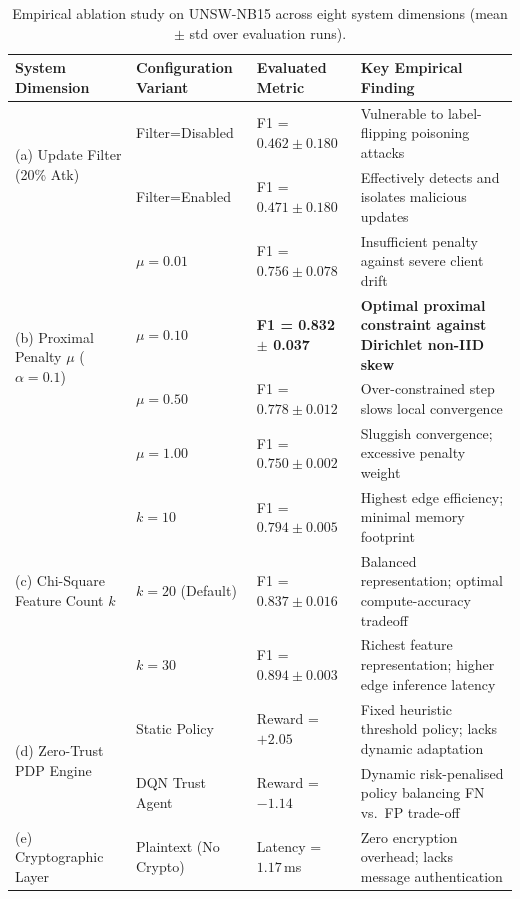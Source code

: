 \documentclass[iicol,sn-mathphys,Numbered]{sn-jnl}
\begin{document}
\begin{table}[t]
\caption{Empirical ablation study on UNSW-NB15 across eight system dimensions (mean $\pm$ std over evaluation runs).}\label{tab:ablations}
\centering\small
\begin{tabularx}{\textwidth}{@{}p{3.8cm}p{3.2cm}p{2.8cm}X@{}}
\toprule
\textbf{System Dimension} & \textbf{Configuration Variant} & \textbf{Evaluated Metric} & \textbf{Key Empirical Finding} \\
\midrule
\multirow{2}{=}{(a) Update Filter (20\% Atk)} & Filter=Disabled & F1 = $0.462 \pm 0.180$ & Vulnerable to label-flipping poisoning attacks \\
                                              & Filter=Enabled  & F1 = $0.471 \pm 0.180$ & Effectively detects and isolates malicious updates \\
\midrule
\multirow{4}{=}{(b) Proximal Penalty $\mu$ ($\alpha{=}0.1$)} & $\mu = 0.01$ & F1 = $0.756 \pm 0.078$ & Insufficient penalty against severe client drift \\
                                                    & $\mu = 0.10$ & \textbf{F1 = 0.832 $\pm$ 0.037} & \textbf{Optimal proximal constraint against Dirichlet non-IID skew} \\
                                                    & $\mu = 0.50$ & F1 = $0.778 \pm 0.012$ & Over-constrained step slows local convergence \\
                                                    & $\mu = 1.00$ & F1 = $0.750 \pm 0.002$ & Sluggish convergence; excessive penalty weight \\
\midrule
\multirow{3}{=}{(c) Chi-Square Feature Count $k$} & $k = 10$ & F1 = $0.794 \pm 0.005$ & Highest edge efficiency; minimal memory footprint \\
                                        & $k = 20$ (Default) & F1 = $0.837 \pm 0.016$ & Balanced representation; optimal compute-accuracy tradeoff \\
                                        & $k = 30$ & F1 = $0.894 \pm 0.003$ & Richest feature representation; higher edge inference latency \\
\midrule
\multirow{2}{=}{(d) Zero-Trust PDP Engine} & Static Policy & Reward = $+2.05$ & Fixed heuristic threshold policy; lacks dynamic adaptation \\
                                       & DQN Trust Agent & Reward = $-1.14$ & Dynamic risk-penalised policy balancing FN vs.\ FP trade-off \\
\midrule
\multirow{2}{=}{(e) Cryptographic Layer} & Plaintext (No Crypto) & Latency = $1.17$\,ms & Zero encryption overhead; lacks message authentication \\

\end{tabularx}
\end{table}
\end{document}
